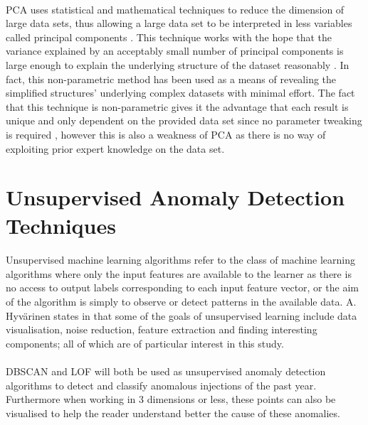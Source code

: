 \paragraph{ }\acs{PCA} uses statistical and mathematical techniques to reduce the dimension of large data sets, thus allowing a large data set to be interpreted in less variables called principal components \cite{Richardson2009}. This technique works with the hope that the variance explained by an acceptably small number of principal components is large enough to explain the underlying structure of the dataset reasonably \cite{Shlens2014}. In fact, this non-parametric method has been used as a means of revealing the simplified structures' underlying complex datasets with minimal effort. The fact that this technique is non-parametric gives it the advantage that each result is unique and only dependent on the provided data set since no parameter tweaking is required \cite{Shlens2014}, however this is also a weakness of \acs{PCA} as there is no way of exploiting prior expert knowledge on the data set.

\section{Unsupervised Anomaly Detection Techniques}

\paragraph{ }Unsupervised machine learning algorithms refer to the class of machine learning algorithms where only the input features are available to the learner as there is no access to output labels corresponding to each input feature vector, or the aim of the algorithm is simply to observe or detect patterns in the available data. A. Hyv\"{a}rinen states in \cite{Hyvarinen2015} that some of the goals of unsupervised learning include data visualisation, noise reduction, feature extraction and finding interesting components; all of which are of particular interest in this study.

\paragraph{ }\ac{DBSCAN} and \ac{LOF} will both be used as unsupervised anomaly detection algorithms to detect and classify anomalous injections of the past year. Furthermore when working in 3 dimensions or less, these points can also be visualised to help the reader understand better the cause of these anomalies. 

